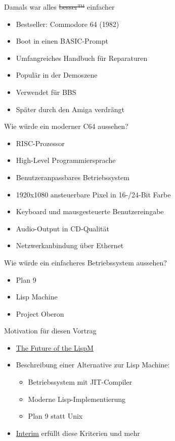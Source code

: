 \documentclass[presentation]{beamer}
\begin{document}
\begin{frame}[label=sec-1-4]{Damals war alles \sout{besser™} einfacher}
\begin{itemize}
\item Bestseller: Commodore 64 (1982)
\item Boot in einen BASIC-Prompt
\item Umfangreiches Handbuch für Reparaturen
\item Populär in der Demoszene
\item Verwendet für BBS
\item Später durch den Amiga verdrängt
\end{itemize}
\end{frame}

\begin{frame}[label=sec-1-5]{Wie würde ein moderner C64 aussehen?}
\begin{itemize}
\item RISC-Prozessor
\item High-Level Programmiersprache
\item Benutzeranpassbares Betriebssystem
\item 1920x1080 ansteuerbare Pixel in 16-/24-Bit Farbe
\item Keyboard und mausgesteuerte Benutzereingabe
\item Audio-Output in CD-Qualität
\item Netzwerkanbindung über Ethernet
\end{itemize}
\end{frame}

\begin{frame}[label=sec-1-6]{Wie würde ein einfacheres Betriebssystem aussehen?}
\begin{itemize}
\item Plan 9
\item Lisp Machine
\item Project Oberon
\end{itemize}
\end{frame}

\begin{frame}[label=sec-1-7]{Motivation für diesen Vortrag}
\begin{itemize}
\item \href{https://www.arrdem.com/2014/11/28/the_future_of_the_lispm/}{The Future of the LispM}
\item Beschreibung einer Alternative zur Lisp Machine:
\begin{itemize}
\item Betriebssystem mit JIT-Compiler
\item Moderne Lisp-Implementierung
\item Plan 9 statt Unix
\end{itemize}
\item \href{http://dump.mntmn.com/interim-paper/}{Interim} erfüllt diese Kriterien und mehr
\end{itemize}
\end{frame}
\end{document}
